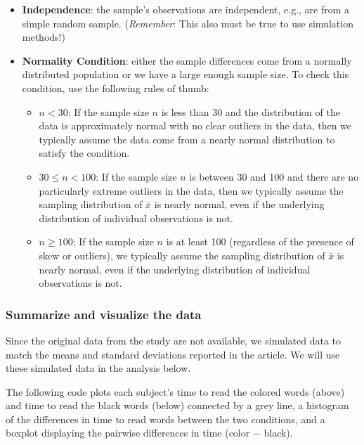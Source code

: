 \documentclass[
]{report}
\begin{document}
\begin{itemize}
\item
  \textbf{Independence}: the sample's observations are independent, e.g., are from a simple random sample. (\emph{Remember}: This also must be true to use simulation methods!)
\item
  \textbf{Normality Condition}: either the sample differences come from a normally distributed population or we have a large enough sample size. To check this condition, use the following rules of thumb:

  \begin{itemize}
  \item
    \(n < 30\): If the sample size \(n\) is less than 30 and the distribution of the data is approximately normal with no clear outliers in the data, then we typically assume the data come from a nearly normal distribution to satisfy the condition.
  \item
    \(30 \leq n < 100\): If the sample size \(n\) is between 30 and 100 and there are no particularly extreme outliers in the data, then we typically assume the sampling distribution of \(\bar{x}\) is nearly normal, even if the underlying distribution of individual observations is not.
  \item
    \(n \geq 100\): If the sample size \(n\) is at least 100 (regardless of the presence of skew or outliers), we typically assume the sampling distribution of \(\bar{x}\) is nearly normal, even if the underlying distribution of individual observations is not.
  \end{itemize}
\end{itemize}

\subsubsection*{Summarize and visualize the data}\label{summarize-and-visualize-the-data-4}

Since the original data from the study are not available, we simulated data to match the means and standard deviations reported in the article. We will use these simulated data in the analysis below.

The following code plots each subject's time to read the colored words (above) and time to read the black words (below) connected by a grey line, a histogram of the differences in time to read words between the two conditions, and a boxplot displaying the pairwise differences in time (color \(-\) black).
\end{document}
